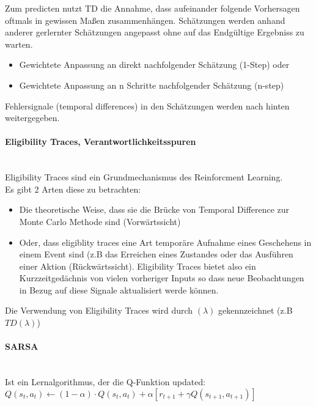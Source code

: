 Zum predicten nutzt TD die Annahme, dass aufeinander folgende Vorhersagen
oftmals in gewissen Maßen zusammenhängen. Schätzungen werden anhand anderer
gerlernter Schätzungen angepasst ohne auf das Endgültige Ergebniss zu warten.

\begin{itemize}
    \item Gewichtete Anpassung an direkt nachfolgender Schätzung (1-Step) oder
    \item Gewichtete Anpassung an n Schritte nachfolgender Schätzung (n-step)
\end{itemize}

Fehlersignale (temporal differences) in den Schätzungen werden nach hinten
weitergegeben.

\paragraph{Eligibility Traces, Verantwortlichkeitsspuren} \mbox{} \\
Eligibility Traces sind ein Grundmechanismus des Reinforcment Learning. \\
Es gibt 2 Arten diese zu betrachten:
\begin{itemize}
    \item Die theoretische Weise, dass sie die Brücke von Temporal Difference
    zur Monte Carlo Methode sind (Vorwärtssicht)
    \item Oder, dass eligiblity traces eine Art temporäre Aufnahme eines
    Geschehens in einem Event sind (z.B das Erreichen eines Zustandes oder das
    Ausführen einer Aktion (Rückwärtssicht). Eligibility Traces bietet also ein
    Kurzzeitgedächnis von vielen vorheriger Inputs so dass neue Beobachtungen
    in Bezug auf diese Signale aktualisiert werde können.
\end{itemize}
Die Verwendung von Eligibility Traces wird durch $(\lambda)$ gekennzeichnet (z.B
$TD(\lambda)$)
\paragraph{SARSA} \mbox{} \\
Ist ein Lernalgorithmus, der die Q-Funktion updated:
$Q(s_t,a_t) \leftarrow (1-\alpha) \cdot Q(s_t,a_t) + \alpha [r_{t+1} + \gamma Q(s_{t+1}, a_{t+1})]$
